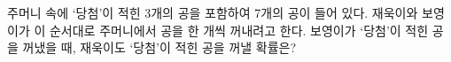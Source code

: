 주머니 속에 ‘당첨’이 적힌 3개의 공을 포함하여 7개의 공이 들어 있다. 재욱이와 보영이가 이 순서대로 주머니에서 공을 한 개씩 꺼내려고 한다. 보영이가 ‘당첨’이 적힌 공을 꺼냈을 때, 재욱이도 ‘당첨’이 적힌 공을 꺼낼 확률은?
